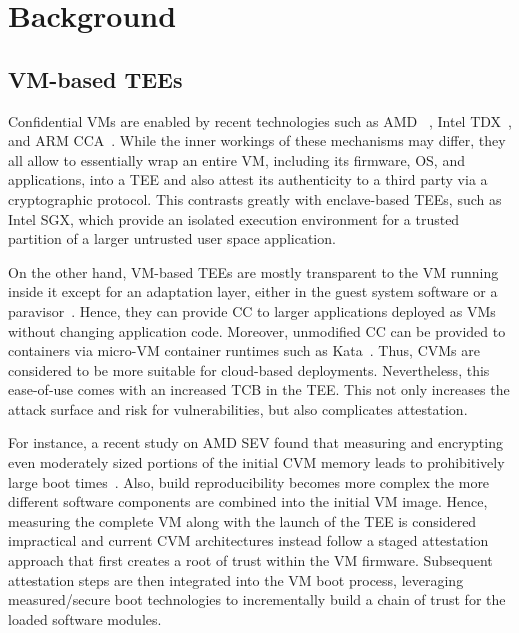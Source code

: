 \section{Background}

\subsection{VM-based TEEs}
%
Confidential VMs are enabled by recent technologies such as AMD
\sevsnp~\cite{AmdSevSnpWhitepaper}, Intel \ac{TDX}~\cite{intelTdxWhitepaper},
and ARM \ac{CCA}~\cite{armCCA}. While the inner workings of these mechanisms may
differ, they all allow to essentially wrap an entire VM, including its firmware,
OS, and applications, into a \ac{TEE} and also attest its authenticity to a
third party via a cryptographic protocol. This contrasts greatly with
enclave-based \acp{TEE}, such as Intel SGX, which provide an isolated execution
environment for a trusted partition of a larger untrusted user space
application. 


On the other hand, VM-based \acp{TEE} are mostly transparent to the VM running
inside it except for an adaptation layer, either in the guest system software or
a paravisor~\cite{coconutSVSM}. Hence, they can provide \ac{CC} to larger
applications deployed as VMs without changing application code. Moreover,
unmodified \ac{CC} can be provided to containers via micro-VM container runtimes
such as Kata~\cite{kata}. Thus, \acp{CVM} are considered to be more suitable for
cloud-based deployments.
%
%
Nevertheless, this ease-of-use comes with an increased \ac{TCB} in the \ac{TEE}.
This not only increases the attack surface and risk for vulnerabilities, but
also complicates attestation. 

For instance, a recent study on AMD SEV found that measuring and encrypting even
moderately sized portions of the initial CVM memory leads to prohibitively large
boot times~\cite{severifast}. Also, build reproducibility becomes more complex
the more different software components are combined into the initial VM image.
Hence, measuring the complete VM along with the launch of the \ac{TEE} is
considered impractical and current \ac{CVM} architectures instead follow a
staged attestation approach that first creates a root of trust within the VM
firmware. Subsequent attestation steps are then integrated into the VM boot
process, leveraging measured/secure boot technologies to incrementally build a
chain of trust for the loaded software modules.

